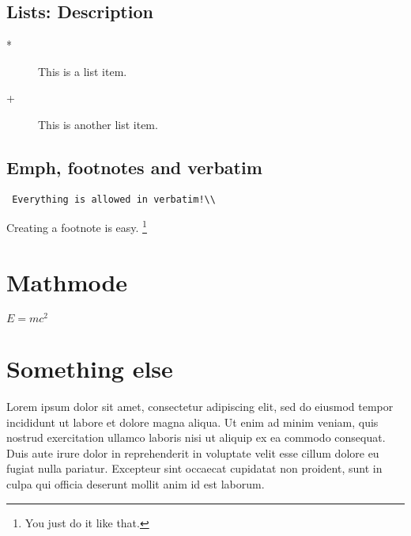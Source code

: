 \documentclass[a4paper, 10pt]{article}
\begin{document}
 \subsection{Lists: Description}
  \begin{description}
   \item[*] This is a list item.
   \item[+] This is another list item.
  \end{description}

 \subsection{Emph, footnotes and verbatim}
  \begin{verbatim} Everything is allowed in verbatim!\\ \end{verbatim}
  Creating a footnote is easy. \footnote{You just do it like that.}
 
 \section{Mathmode}
  $ E=m c^{2} $ 

 \section{Something else}
 Lorem ipsum dolor sit amet, consectetur adipiscing elit, sed do eiusmod tempor incididunt ut labore et dolore magna aliqua. Ut enim ad minim veniam, quis nostrud exercitation ullamco laboris nisi ut aliquip ex ea commodo consequat. Duis aute irure dolor in reprehenderit in voluptate velit esse cillum dolore eu fugiat nulla pariatur. Excepteur sint occaecat cupidatat non proident, sunt in culpa qui officia deserunt mollit anim id est laborum.
\end{document}
